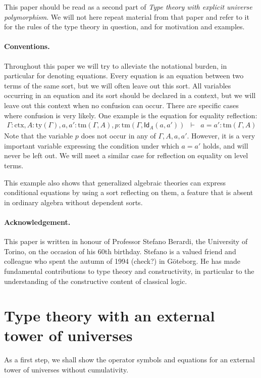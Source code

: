 \documentclass[11pt,a4paper]{article}
\theoremstyle{definition}
\newcommand{\Id}{\mathsf{Id}}
\newcommand{\ctx}{\mathrm{ctx}}
\newcommand{\ty}{\mathrm{ty}}
\newcommand{\tm}{\mathrm{tm}}
\begin{document}
This paper should be read as a second part of {\em Type theory with explicit universe polymorphism}. We will not here repeat material from that paper and refer to it for the rules of the type theory in question, and for motivation and examples. 

\paragraph{Conventions.} Throughout this paper we will try to alleviate
the notational burden, in particular for denoting equations.
Every equation is an equation between two terms of the same sort, 
but we will often leave out this sort. 
All variables occurring in an equation and its sort should be declared 
in a context, but we will leave out this context when no confusion can occur.
There are specific cases where confusion is very likely. One example is
the equation for equality reflection:
\begin{eqnarray*}
\Gamma : \ctx, A : \ty(\Gamma), a, a' : \tm(\Gamma, A),p :  \tm(\Gamma,\Id_A(a,a'))&\vdash& a = a' : \tm(\Gamma,A)
\end{eqnarray*}
Note that the variable $p$ does not occur in any of $\Gamma,A,a,a'$.
However, it is a very important variable expressing
the condition under which $a=a'$ holds, and will never be left out.
We will meet a similar case for reflection on equality on level terms.

This example also shows that generalized algebraic theories can express 
conditional equations by using a sort reflecting on them, 
a feature that is absent in ordinary algebra without dependent sorts.

\paragraph{Acknowledgement.} This paper is written in honour of Professor Stefano Berardi, the University of Torino, on the occasion of his 60th birthday. Stefano is a valued friend and colleague who spent the autumn of 1994 (check?) in Göteborg. He has made fundamental contributions to type theory and constructivity, in particular to the understanding of the constructive content of classical logic.

\section{Type theory with an external tower of universes}

As a first step, we shall show the operator symbols and equations for an external tower of universes without cumulativity. %
\end{document}
